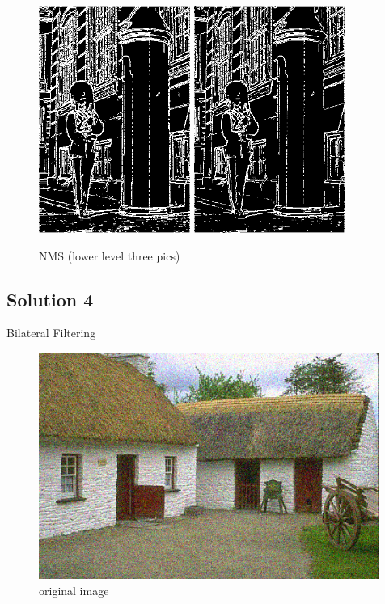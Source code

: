 \documentclass{article}
\newcommand{\solution}[1]{\clearpage \subsection*{Solution #1}}  %
\begin{document}
\begin{figure}[h!]
	\includegraphics[height=20em]{code/outputs/prob3_b_nms1.png}
	\includegraphics[height=20em]{code/outputs/prob3_b_nms2.png}
  \caption{NMS (lower level three pics)}
\end{figure}

\solution{4} Bilateral Filtering

\begin{figure}[h!]
  \centering
  	\includegraphics[height=20em]{code/inputs/p4_nz1.png}
  \caption{original image}
\end{figure}
\end{document}
